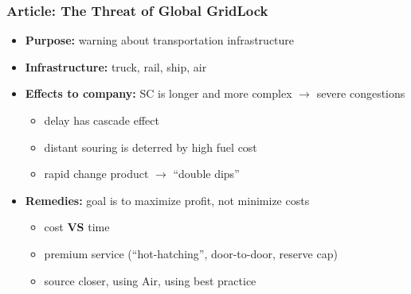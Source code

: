 \documentclass[10pt,presentation]{beamer}
\begin{document}
\begin{frame}
  \end{frame}


\begin{frame}
  \frametitle{Article: The Threat of Global GridLock \forIE}

    \begin{itemize}
      \item \textbf{Purpose:} warning about transportation infrastructure
      \item \textbf{Infrastructure:} truck, rail, ship, air
      \item \textbf{Effects to company:} SC is longer and more complex $\rightarrow$ severe congestions
      \begin{itemize}
        \item delay has cascade effect
        \item distant souring is deterred by  high fuel cost
        \item rapid change product $\rightarrow$ ``double dips'' \NextHalfLine
      \end{itemize}
      \item \textbf{Remedies:} goal is to maximize profit, not minimize costs
      \begin{itemize}
        \item cost \textbf{VS} time
        \item premium service (``hot-hatching'', door-to-door, reserve cap)
        \item source closer, using Air, using best practice
      \end{itemize}
    \end{itemize}


\end{frame}
\end{document}
